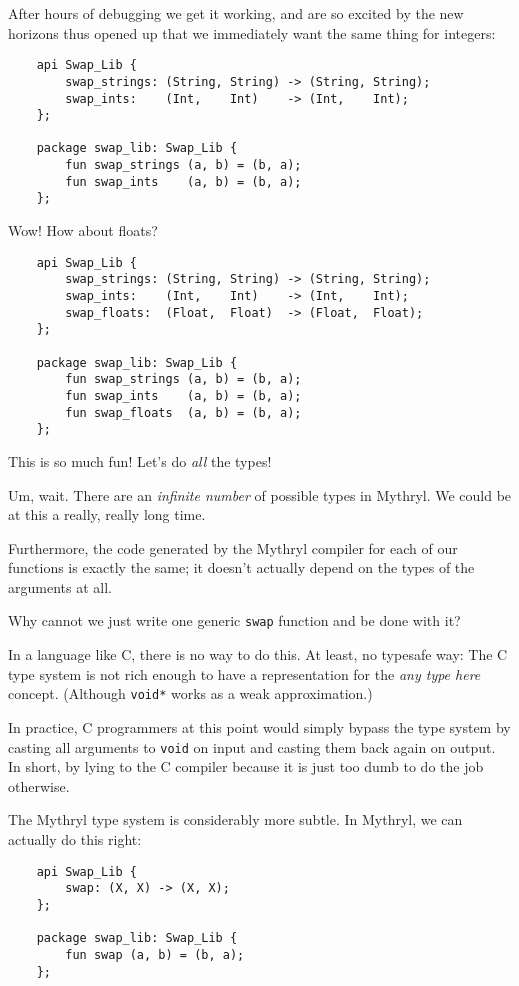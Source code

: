After hours of debugging we get it working, and are so excited by the 
new horizons thus opened up that we immediately want the same thing 
for integers:

\begin{verbatim}
    api Swap_Lib { 
        swap_strings: (String, String) -> (String, String);
        swap_ints:    (Int,    Int)    -> (Int,    Int);
    };

    package swap_lib: Swap_Lib {
        fun swap_strings (a, b) = (b, a);
        fun swap_ints    (a, b) = (b, a);
    };
\end{verbatim}

Wow!  How about floats?

\begin{verbatim}
    api Swap_Lib { 
        swap_strings: (String, String) -> (String, String);
        swap_ints:    (Int,    Int)    -> (Int,    Int);
        swap_floats:  (Float,  Float)  -> (Float,  Float);
    };

    package swap_lib: Swap_Lib {
        fun swap_strings (a, b) = (b, a);
        fun swap_ints    (a, b) = (b, a);
        fun swap_floats  (a, b) = (b, a);
    };
\end{verbatim}

This is so much fun!  Let's do {\it all} the types!

Um, wait.  There are an {\it infinite number} of possible types in 
Mythryl.  We could be at this a really, really long time.

Furthermore, the code generated by the Mythryl compiler for each of our 
functions is exactly the same;  it doesn't actually depend on the types 
of the arguments at all.

Why cannot we just write one generic {\tt swap} function and be done with it?

In a language like C, there is no way to do this.  At least, no typesafe 
way:  The C type system is not rich enough to have a representation for 
the {\it any type here} concept.  (Although {\tt void*} works as a 
weak approximation.)

In practice, C programmers at this point would simply bypass the type 
system by casting all arguments to {\tt void} on input and casting them 
back again on output.  In short, by lying to the C compiler because it 
is just too dumb to do the job otherwise.

The Mythryl type system is considerably more subtle.  In Mythryl, we can 
actually do this right:

\begin{verbatim}
    api Swap_Lib { 
        swap: (X, X) -> (X, X);
    };

    package swap_lib: Swap_Lib {
        fun swap (a, b) = (b, a);
    };
\end{verbatim}

